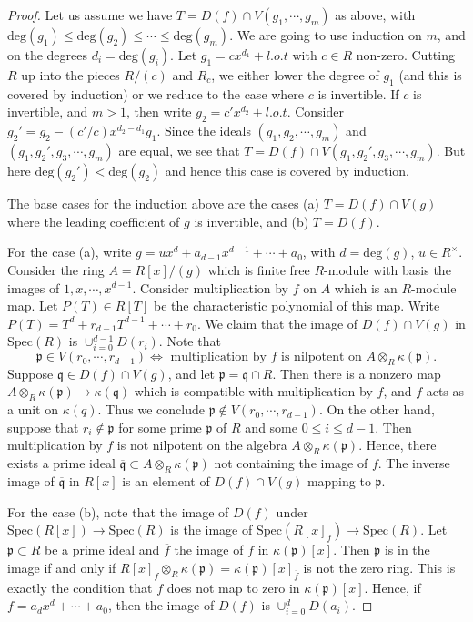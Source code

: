 \documentclass{article}
\begin{document}
\begin{proof}
    Let us assume we have $T = D(f) \cap V(g_1,\cdots,g_m)$ as above, with $\mathrm{deg}(g_1) \le \mathrm{deg}(g_2) \le \cdots \le \mathrm{deg}(g_m)$. We are going to use induction on $m$, and on the degrees $d_i = \mathrm{deg}(g_i)$. Let $g_1 = c x^{d_1} + l.o.t$ with $c \in R$ non-zero. Cutting $R$ up into the pieces $R/(c)$ and $R_c$, we either lower the degree of $g_1$ (and this is covered by induction) or we reduce to the case where $c$ is invertible. If $c$ is invertible, and $m >1$, then write $g_2 = c'x^{d_2}+l.o.t$. Consider $g_2' = g_2 - (c'/c)x^{d_2-d_1} g_1$. Since the ideals $(g_1,g_2,\cdots,g_m)$ and $(g_1,g_2',g_3,\cdots,g_m)$ are equal, we see that $T = D(f) \cap V(g_1,g_2',g_3,\cdots,g_m)$. But here $\mathrm{deg}(g_2') < \mathrm{deg}(g_2)$ and hence this case is covered by induction.

    The base cases for the induction above are the cases (a) $T = D(f) \cap V(g)$ where the leading coefficient of $g$ is invertible, and (b) $T = D(f)$.

    For the case (a), write $g = u x^d + a_{d-1} x^{d-1} + \cdots + a_0$, with $d = \mathrm{deg}(g)$, $u \in R^\times$. Consider the ring $A = R[x]/(g)$ which is finite free $R$-module with basis the images of $1,x,\cdots,x^{d-1}$. Consider multiplication by $f$ on $A$ which is an $R$-module map. Let $P(T) \in R[T]$ be the characteristic polynomial of this map. Write $P(T)= T^d + r_{d-1}T^{d-1} + \cdots + r_0$. We claim that the image of $D(f) \cap V(g)$ in $\mathrm{Spec} (R)$ is $\cup_{i=0}^{d-1} D(r_i)$. Note that
    \[
        \mathfrak{p} \in V(r_0,\cdots,r_{d-1}) \Leftrightarrow \text{ multiplication by $f$ is nilpotent on $A \otimes_R \kappa(\mathfrak{p})$.}
    \]
    Suppose $\mathfrak{q} \in D(f) \cap V(g)$, and let $\mathfrak{p} = \mathfrak{q} \cap R$. Then there is a nonzero map $A \otimes_R \kappa(\mathfrak{p}) \to \kappa(\mathfrak{q})$ which is compatible with multiplication by $f$, and $f$ acts as a unit on $\kappa(q)$. Thus we conclude $\mathfrak{p} \notin V(r_0,\cdots,r_{d-1})$. On the other hand, suppose that $r_i \notin \mathfrak{p}$ for some prime $\mathfrak{p}$ of $R$ and some $0 \le i \le d-1$. Then multiplication by $f$ is not nilpotent on the algebra $A \otimes_R \kappa(\mathfrak{p})$. Hence, there exists a prime ideal $\overline{\mathfrak{q}} \subset A \otimes_R \kappa (\mathfrak{p})$ not containing the image of $f$. The inverse image of $\overline{\mathfrak{q}}$ in $R[x]$ is an element of $D(f) \cap V(g) $ mapping to $\mathfrak{p}$.

    For the case (b), note that the image of $D(f)$ under $\mathrm{Spec}(R[x]) \to \mathrm{Spec}(R)$ is the image of $\mathrm{Spec}(R[x]_f) \to \mathrm{Spec}(R)$. Let $\mathfrak{p} \subset R$ be a prime ideal and $\overline{f}$ the image of $f$ in $\kappa(\mathfrak{p})[x]$. Then $\mathfrak{p}$ is in the image if and only if $R[x]_f \otimes_R \kappa(\mathfrak{p}) = \kappa(\mathfrak{p})[x]_{\overline{f}}$ is not the zero ring. This is exactly the condition that $f$ does not map to zero in $\kappa(\mathfrak{p})[x]$. Hence, if $f = a_d x^d + \cdots + a_0$, then the image of $D(f)$ is $\cup_{i=0}^d D(a_i)$.
\end{proof}
\end{document}

